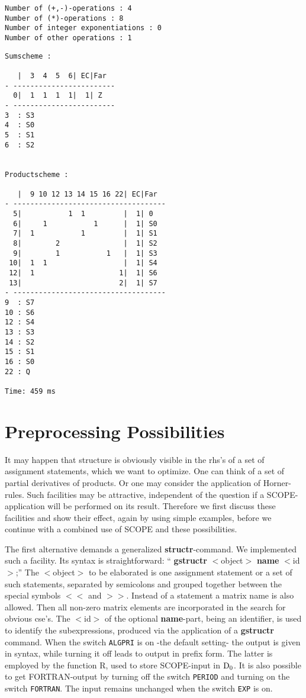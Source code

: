{\begin{verbatim}
Number of (+,-)-operations : 4
Number of (*)-operations : 8
Number of integer exponentiations : 0
Number of other operations : 1
\end{verbatim}
\newpage
\begin{verbatim}
Sumscheme :

   |  3  4  5  6| EC|Far
- ------------------------
  0|  1  1  1  1|  1| Z
- ------------------------
3  : S3
4  : S0
5  : S1
6  : S2


Productscheme :

   |  9 10 12 13 14 15 16 22| EC|Far
- ------------------------------------
  5|           1  1         |  1| 0
  6|     1           1      |  1| S0
  7|  1           1         |  1| S1
  8|        2               |  1| S2
  9|        1           1   |  1| S3
 10|  1  1                  |  1| S4
 12|  1                    1|  1| S6
 13|                       2|  1| S7
- ------------------------------------
9  : S7
10 : S6
12 : S4
13 : S3
14 : S2
15 : S1
16 : S0
22 : Q

Time: 459 ms
\end{verbatim}
}

\section{Preprocessing Possibilities}\label{SCOPE:pre}

It may happen that structure is obviously visible in the rhs's of a
set of assignment statements, which we want to optimize.  One can
think of a set of partial derivatives of products.  Or one may
consider the application of Horner-rules.  Such facilities may be
attractive, independent of the question if a SCOPE-application will be
performed on its result.  Therefore we first discuss these facilities
and show their effect, again by using simple examples, before we
continue with a combined use of SCOPE and these possibilities.

The first alternative demands a generalized {\bf structr}-command.  We
implemented such a facility. Its syntax is straightforward: ``{\bf
{}
gstructr} $<$object$>$ {\bf name} $<$id$>$;'' The $<$object$>$ to be
elaborated is one assignment statement or a set of such statements,
separated by semicolons and grouped together between the special
symbols $<<$ and $>>$. Instead of a statement a matrix name is also
allowed. Then all non-zero matrix elements are incorporated in the
search for obvious cse's. The $<$id$>$ of the optional {\bf name}-part,
being an identifier, is used to identify the subexpressions, produced
via the application of a {\bf gstructr} command. When the switch
{\tt ALGPRI} is on -the default setting- the output is given in {\REDUCE}
syntax, while turning it off leads to output in prefix form.  The
latter is employed by the function R, used to store SCOPE-input in
${{\rm D}}_{0}$.  It is also possible to get FORTRAN-output by turning
 
off the switch {\tt PERIOD} and turning on the switch {\tt FORTRAN}.  The input
remains unchanged when the switch {\tt EXP} is on.

